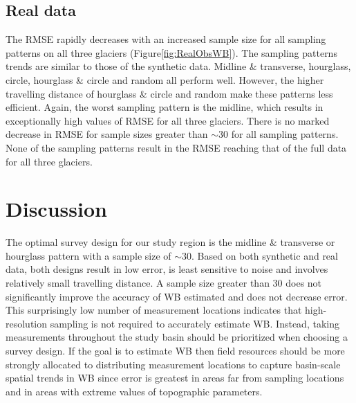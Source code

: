 \documentclass[twocolumn,letterpaper]{igs}
\begin{document}
\subsection{Real data}

The RMSE rapidly decreases with an increased sample size for all sampling patterns on all three glaciers (Figure\ref{fig:RealObsWB}). The sampling patterns trends are similar to those of the synthetic data. Midline \& transverse, hourglass, circle, hourglass \& circle and random all perform well. However, the higher travelling distance of hourglass \& circle and random make these patterns less efficient.  Again, the worst sampling pattern is the midline, which results in exceptionally high values of RMSE for all three glaciers. There is no marked decrease in RMSE for sample sizes greater than $\sim30$ for all sampling patterns. None of the sampling patterns result in the RMSE reaching that of the full data for all three glaciers. 

\section{Discussion}

The optimal survey design for our study region is the midline \& transverse or  hourglass pattern with a sample size of $\sim30$. Based on both synthetic and real data, both designs result in low error, is least sensitive to noise and involves relatively small travelling distance. A sample size greater than 30 does not significantly improve the accuracy of WB estimated and does not decrease error. This surprisingly low number of measurement locations indicates that high-resolution sampling is not required to accurately estimate WB. Instead, taking measurements throughout the study basin should be prioritized when choosing a survey design. If the goal is to estimate WB then field resources should be more strongly allocated to distributing measurement locations to capture basin-scale spatial trends in WB since error is greatest in areas far from sampling locations and in areas with extreme values of topographic parameters. 
\end{document}
